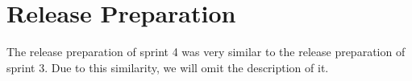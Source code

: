 \section{Release Preparation}

The release preparation of sprint 4 was very similar to the release preparation of sprint 3. Due to this similarity, we will omit the description of it.
